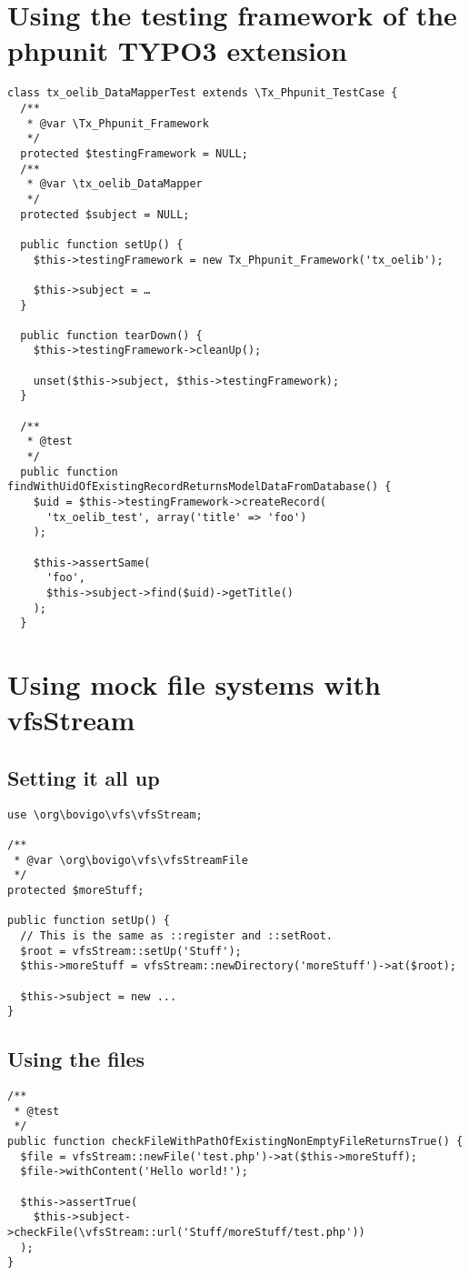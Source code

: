 \documentclass[a4paper,twoside,landscape]{scrartcl}
\begin{document}
\newpage

\section{Using the testing framework of the phpunit TYPO3 extension}

\small
\begin{verbatim}
class tx_oelib_DataMapperTest extends \Tx_Phpunit_TestCase {
  /**
   * @var \Tx_Phpunit_Framework
   */
  protected $testingFramework = NULL;
  /**
   * @var \tx_oelib_DataMapper
   */
  protected $subject = NULL;

  public function setUp() {
    $this->testingFramework = new Tx_Phpunit_Framework('tx_oelib');

    $this->subject = …
  }

  public function tearDown() {
    $this->testingFramework->cleanUp();

    unset($this->subject, $this->testingFramework);
  }

  /**
   * @test
   */
  public function findWithUidOfExistingRecordReturnsModelDataFromDatabase() {
    $uid = $this->testingFramework->createRecord(
      'tx_oelib_test', array('title' => 'foo')
    );

    $this->assertSame(
      'foo',
      $this->subject->find($uid)->getTitle()
    );
  }
\end{verbatim}
\normalsize

\section{Using mock file systems with vfsStream}
\subsection{Setting it all up}
\begin{verbatim}
use \org\bovigo\vfs\vfsStream;

/**
 * @var \org\bovigo\vfs\vfsStreamFile
 */
protected $moreStuff;

public function setUp() {
  // This is the same as ::register and ::setRoot.
  $root = vfsStream::setUp('Stuff');
  $this->moreStuff = vfsStream::newDirectory('moreStuff')->at($root);

  $this->subject = new ...
}
\end{verbatim}

\subsection{Using the files}
\begin{verbatim}
/**
 * @test
 */
public function checkFileWithPathOfExistingNonEmptyFileReturnsTrue() {
  $file = vfsStream::newFile('test.php')->at($this->moreStuff);
  $file->withContent('Hello world!');

  $this->assertTrue(
    $this->subject->checkFile(\vfsStream::url('Stuff/moreStuff/test.php'))
  );
}
\end{verbatim}
\end{document}
